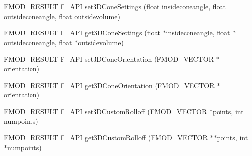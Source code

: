 \begin{DoxyCompactItemize}
\item 
\hyperlink{fmod_8h_ae6ddadf8cb315e93ae7e6456b19db276}{F\-M\-O\-D\-\_\-\-R\-E\-S\-U\-L\-T} \hyperlink{fmod_8h_ace803d13e798b0cdde4384f9f323b901}{F\-\_\-\-A\-P\-I} \hyperlink{class_f_m_o_d_1_1_channel_a9e0d8885d31b2978683d5305924de565}{set3\-D\-Cone\-Settings} (\hyperlink{fmod_8h_aeb841aa4b4b5f444b5d739d865b420af}{float} insideconeangle, \hyperlink{fmod_8h_aeb841aa4b4b5f444b5d739d865b420af}{float} outsideconeangle, \hyperlink{fmod_8h_aeb841aa4b4b5f444b5d739d865b420af}{float} outsidevolume)
\item 
\hyperlink{fmod_8h_ae6ddadf8cb315e93ae7e6456b19db276}{F\-M\-O\-D\-\_\-\-R\-E\-S\-U\-L\-T} \hyperlink{fmod_8h_ace803d13e798b0cdde4384f9f323b901}{F\-\_\-\-A\-P\-I} \hyperlink{class_f_m_o_d_1_1_channel_a7206e7b2353ed27ec91512690bd2c052}{get3\-D\-Cone\-Settings} (\hyperlink{fmod_8h_aeb841aa4b4b5f444b5d739d865b420af}{float} $\ast$insideconeangle, \hyperlink{fmod_8h_aeb841aa4b4b5f444b5d739d865b420af}{float} $\ast$outsideconeangle, \hyperlink{fmod_8h_aeb841aa4b4b5f444b5d739d865b420af}{float} $\ast$outsidevolume)
\item 
\hyperlink{fmod_8h_ae6ddadf8cb315e93ae7e6456b19db276}{F\-M\-O\-D\-\_\-\-R\-E\-S\-U\-L\-T} \hyperlink{fmod_8h_ace803d13e798b0cdde4384f9f323b901}{F\-\_\-\-A\-P\-I} \hyperlink{class_f_m_o_d_1_1_channel_a6c10b3cdb50cb11d5090b14b7f569a79}{set3\-D\-Cone\-Orientation} (\hyperlink{struct_f_m_o_d___v_e_c_t_o_r}{F\-M\-O\-D\-\_\-\-V\-E\-C\-T\-O\-R} $\ast$orientation)
\item 
\hyperlink{fmod_8h_ae6ddadf8cb315e93ae7e6456b19db276}{F\-M\-O\-D\-\_\-\-R\-E\-S\-U\-L\-T} \hyperlink{fmod_8h_ace803d13e798b0cdde4384f9f323b901}{F\-\_\-\-A\-P\-I} \hyperlink{class_f_m_o_d_1_1_channel_a0f22cabb2a93d1a8c038293c9a5a970d}{get3\-D\-Cone\-Orientation} (\hyperlink{struct_f_m_o_d___v_e_c_t_o_r}{F\-M\-O\-D\-\_\-\-V\-E\-C\-T\-O\-R} $\ast$orientation)
\item 
\hyperlink{fmod_8h_ae6ddadf8cb315e93ae7e6456b19db276}{F\-M\-O\-D\-\_\-\-R\-E\-S\-U\-L\-T} \hyperlink{fmod_8h_ace803d13e798b0cdde4384f9f323b901}{F\-\_\-\-A\-P\-I} \hyperlink{class_f_m_o_d_1_1_channel_a1ad33a178f33decfc764dfca2ad0aefb}{set3\-D\-Custom\-Rolloff} (\hyperlink{struct_f_m_o_d___v_e_c_t_o_r}{F\-M\-O\-D\-\_\-\-V\-E\-C\-T\-O\-R} $\ast$\hyperlink{glew_8h_a8542fd6d6fb19b09ca970f46a936eeca}{points}, \hyperlink{wglew_8h_a500a82aecba06f4550f6849b8099ca21}{int} numpoints)
\item 
\hyperlink{fmod_8h_ae6ddadf8cb315e93ae7e6456b19db276}{F\-M\-O\-D\-\_\-\-R\-E\-S\-U\-L\-T} \hyperlink{fmod_8h_ace803d13e798b0cdde4384f9f323b901}{F\-\_\-\-A\-P\-I} \hyperlink{class_f_m_o_d_1_1_channel_ae772d709160da9adb23971c6f0b2bc33}{get3\-D\-Custom\-Rolloff} (\hyperlink{struct_f_m_o_d___v_e_c_t_o_r}{F\-M\-O\-D\-\_\-\-V\-E\-C\-T\-O\-R} $\ast$$\ast$\hyperlink{glew_8h_a8542fd6d6fb19b09ca970f46a936eeca}{points}, \hyperlink{wglew_8h_a500a82aecba06f4550f6849b8099ca21}{int} $\ast$numpoints)
$$
\end{DoxyCompactItemize}
